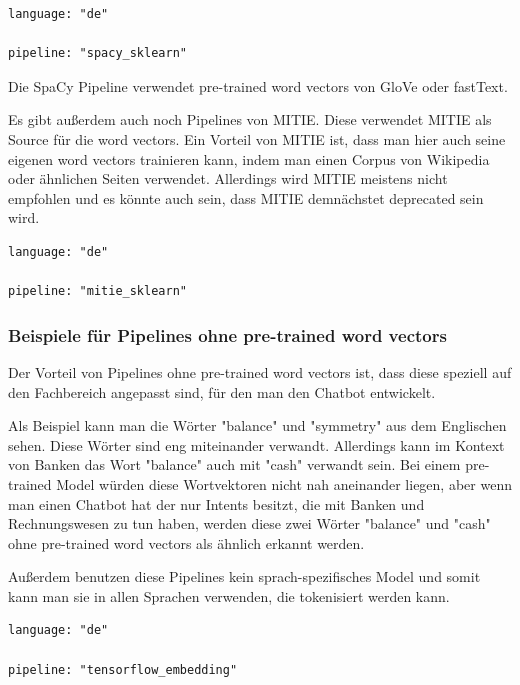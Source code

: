 \begin{lstlisting}[label={lst: Spacy Sklearn Pipeline}]
language: "de"

pipeline: "spacy_sklearn"
\end{lstlisting}

Die SpaCy Pipeline verwendet pre-trained word vectors von GloVe oder fastText.\cite{spacySklearnPipeline, spacyNLP, rasaMasterclassPreConfiguredPipelines}

Es gibt außerdem auch noch Pipelines von MITIE.
Diese verwendet MITIE als Source für die word vectors.
Ein Vorteil von MITIE ist, dass man hier auch seine eigenen word vectors trainieren kann, indem man einen Corpus von Wikipedia oder ähnlichen Seiten verwendet.
Allerdings wird MITIE meistens nicht empfohlen und es könnte auch sein, dass MITIE demnächstet deprecated sein wird.\cite{mitieNLP, mitieDeprecated}

\begin{lstlisting}[label={lst: MITIE Sklearn Pipeline}]
language: "de"

pipeline: "mitie_sklearn"
\end{lstlisting}

\subsubsection{Beispiele für Pipelines ohne pre-trained word vectors}

Der Vorteil von Pipelines ohne pre-trained word vectors ist, dass diese speziell auf den Fachbereich angepasst sind, für den man den Chatbot entwickelt.\cite{pretrainedVsSupervised, tensorFlowEmbedding}

Als Beispiel kann man die Wörter "balance" und "symmetry" aus dem Englischen sehen.
Diese Wörter sind eng miteinander verwandt.
Allerdings kann im Kontext von Banken das Wort "balance" auch mit "cash" verwandt sein.
Bei einem pre-trained Model würden diese Wortvektoren nicht nah aneinander liegen, aber wenn man einen Chatbot hat der nur Intents besitzt, die mit Banken und Rechnungswesen zu tun haben, werden diese zwei Wörter "balance" und "cash" ohne pre-trained word vectors als ähnlich erkannt werden.\cite{tensorFlowEmbedding}

Außerdem benutzen diese Pipelines kein sprach-spezifisches Model und somit kann man sie in allen Sprachen verwenden, die tokenisiert werden kann.\cite{tensorFlowEmbedding}


\begin{lstlisting}[label={lst: Tensorflow Embedding Pipeline}]
language: "de"

pipeline: "tensorflow_embedding"
\end{lstlisting}

